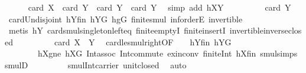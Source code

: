 \begin{isabellebody}
\ \ \ \ \isamarkupfalse%
\ {\isachardoublequoteopen}card\ X\ {\isacharplus}{\kern0pt}\ card\ Y\ {\isasymle}\ card\ Y\ {\isacharplus}{\kern0pt}\ card\ Y{\isachardoublequoteclose}\ \isamarkupfalse%
\ {\isacharparenleft}{\kern0pt}simp\ add{\isacharcolon}{\kern0pt}\ hXY{\isacharparenright}{\kern0pt}\isanewline
\ \ \ \ \isamarkupfalse%
\ \isamarkupfalse%
\ {\isachardoublequoteopen}{\isachardot}{\kern0pt}{\isachardot}{\kern0pt}{\isachardot}{\kern0pt}\ {\isacharequal}{\kern0pt}\ card\ {\isacharquery}{\kern0pt}Y{}{\isachardoublequoteclose}\ \isamarkupfalse%
\ card{\isacharunderscore}{\kern0pt}Un{\isacharunderscore}{\kern0pt}disjoint\ hYfin\ hYG\ hgG\ finite{\isacharunderscore}{\kern0pt}smul\ inf{\isachardot}{\kern0pt}orderE\ invertible\isanewline
\ \ \ \ \ \ \isamarkupfalse%
\ {\isacharparenleft}{\kern0pt}metis\ hY{}\ card{\isacharunderscore}{\kern0pt}smul{\isacharunderscore}{\kern0pt}singleton{\isacharunderscore}{\kern0pt}left{\isacharunderscore}{\kern0pt}eq\ finite{\isachardot}{\kern0pt}emptyI\ finite{\isachardot}{\kern0pt}insertI\ invertible{\isacharunderscore}{\kern0pt}inverse{\isacharunderscore}{\kern0pt}closed{\isacharparenright}{\kern0pt}\isanewline
\ \ \ \ \isamarkupfalse%
\ \isamarkupfalse%
\ {\isachardoublequoteopen}{\isachardot}{\kern0pt}{\isachardot}{\kern0pt}{\isachardot}{\kern0pt}\ {\isasymle}\ card\ {\isacharparenleft}{\kern0pt}{\isacharquery}{\kern0pt}X{}\ {\isasymcdots}\ {\isacharquery}{\kern0pt}Y{}{\isacharparenright}{\kern0pt}{\isachardoublequoteclose}\ \isamarkupfalse%
\ card{\isacharunderscore}{\kern0pt}le{\isacharunderscore}{\kern0pt}smul{\isacharunderscore}{\kern0pt}right{\isacharbrackleft}{\kern0pt}OF\ {\isacharunderscore}{\kern0pt}\ {\isacharunderscore}{\kern0pt}\ {\isacharunderscore}{\kern0pt}\ hY{}fin\ hY{}G{\isacharbrackright}{\kern0pt}\ \isanewline
\ \ \ \ \ \ \ \ hXgne\ hXG\ Int{\isacharunderscore}{\kern0pt}assoc\ Int{\isacharunderscore}{\kern0pt}commute\ ex{\isacharunderscore}{\kern0pt}in{\isacharunderscore}{\kern0pt}conv\ finite{\isacharunderscore}{\kern0pt}Int\ hXfin\ smul{\isachardot}{\kern0pt}simps\ smul{\isacharunderscore}{\kern0pt}D{\isacharparenleft}{\kern0pt}{}{\isacharparenright}{\kern0pt}\ \isanewline
\ \ \ \ \ \ \ \ smul{\isacharunderscore}{\kern0pt}Int{\isacharunderscore}{\kern0pt}carrier\ unit{\isacharunderscore}{\kern0pt}closed\ \isamarkupfalse%
\ auto\isanewline
\ \ \ \ \isamarkupfalse%

\end{isabellebody}
